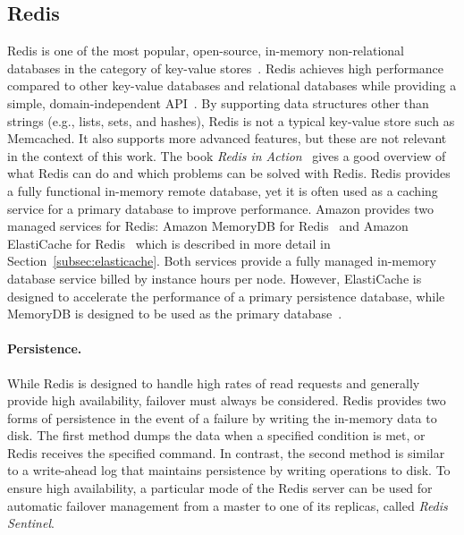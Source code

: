 \subsection{Redis}
\label{subsec:redis}
Redis is one of the most popular, open-source, in-memory non-relational databases in the category of key-value stores~\cite{noauthor_redis_nodate-3}. Redis achieves high performance compared to other key-value databases and relational databases while providing a simple, domain-independent  API~\cite{puangsaijai_comparative_2017, adya_fast_2019}. By supporting data structures other than strings (e.g., lists, sets, and hashes), Redis is not a typical key-value store such as Memcached. It also supports more advanced features, but these are not relevant in the context of this work. The book \emph{Redis in Action}~\cite{noauthor_redis_nodate} gives a good overview of what Redis can do and which problems can be solved with Redis. Redis provides a fully functional in-memory remote database, yet it is often used as a caching service for a primary database to improve performance. Amazon provides two managed services for Redis: Amazon MemoryDB for Redis~\cite{noauthor_amazon_nodate-3} and Amazon ElastiCache for Redis~\cite{noauthor_amazon_nodate-1} which is described in more detail in Section~\ref{subsec:elasticache}. Both services provide a fully managed in-memory database service billed by instance hours per node. However, ElastiCache is designed to accelerate the performance of a primary persistence database, while MemoryDB is designed to be used as the primary database~\cite{noauthor_introducing_2021}.

\paragraph{Persistence.} While Redis is designed to handle high rates of read requests and generally provide high availability, failover must always be considered. Redis provides two forms of persistence in the event of a failure by writing the in-memory data to disk. The first method dumps the data when a specified condition is met, or Redis receives the specified command. In contrast, the second method is similar to a write-ahead log that maintains persistence by writing operations to disk. To ensure high availability, a particular mode of the Redis server can be used for automatic failover management from a master to one of its replicas, called \emph{Redis Sentinel}.  

